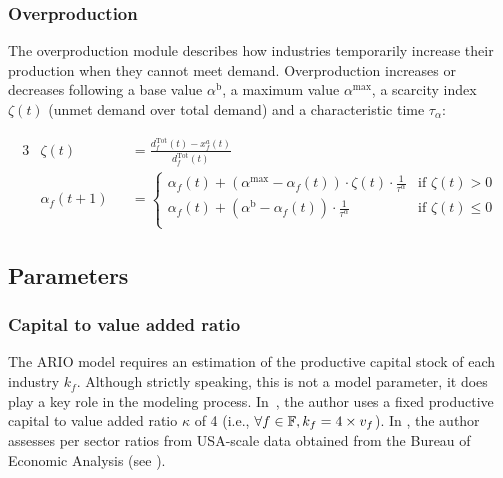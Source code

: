 \subsubsection{Overproduction}
\label{sec:overprod_sh}

The overproduction module describes how industries temporarily increase their
production when they cannot meet demand.
Overproduction increases or decreases following a base value
$\alpha^{\textrm{b}}$, a maximum value $\alpha^{\textrm{max}}$, a scarcity
index $\zeta(t)$ (unmet demand over total demand) and a characteristic time $\tau_{\alpha}$:

\begin{alignat*}{3}
  & \zeta(t) &&= \frac{d_{f}^{\textrm{Tot}}(t) - x^{a}_f(t)}{d_{f}^{\textrm{Tot}}(t)}\\
  & \alpha_f(t+1) &&= \begin{cases}
    \alpha_f(t) + (\alpha^{\textrm{max}} - \alpha_f(t)) \cdot \zeta(t) \cdot \frac{1}{\tau^{\alpha}} & \text{if } \zeta(t) > 0\\
    \alpha_f(t) +  (\alpha^{\textrm{b}}  - \alpha_f(t)) \cdot \frac{1}{\tau^{\alpha}}                & \text{if } \zeta(t) \leq 0\\
  \end{cases}
\end{alignat*}

\subsection{Parameters}
\label{sec:parameters}

\subsubsection{Capital to value added ratio}
\label{sec:capital-to-va}

The ARIO model requires an estimation of the productive capital stock of
each industry $k_f$. Although strictly speaking, this is not a model parameter,
it does play a key role in the modeling process. In~\textcite{hallegatte-2008-adapt-region}, the
author uses a fixed productive capital to value added ratio $\kappa$ of 4 (i.e., $\forall
f \in \mathbb{F}, k_f = 4 \times v_f$). In
\textcite{hallegatte-2013-model-role}, the author assesses per sector
ratios from USA-scale data obtained from the Bureau of Economic Analysis (see
).

